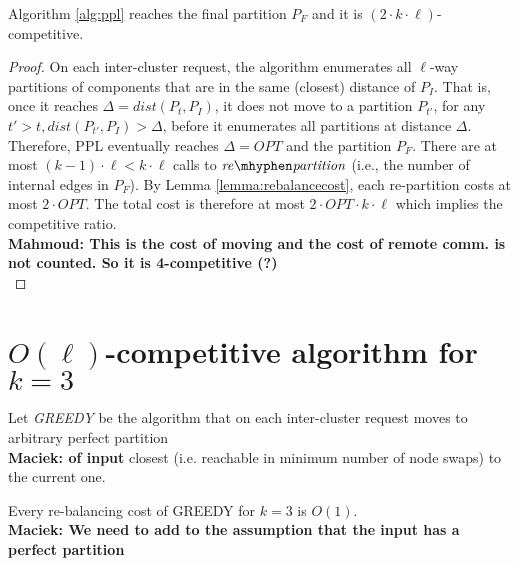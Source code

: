 \documentclass[manuscript,screen=true]{acmart}
\newcommand{\OPT}{\mathit{OPT}}
\newcommand\mahmoud[1]{\color{green}\textbf{\\ Mahmoud: #1}\\\color{black}}
\newcommand\maciek[1]{\color{brown}\textbf{\\ Maciek: #1}\color{black}}
\begin{document}
\begin{theorem}	\label{thm:upperbound}
    Algorithm \ref{alg:ppl} reaches the final partition $P_F$ and it is $(2\cdot k\cdot\ell)$-competitive.
\end{theorem}
\begin{proof}
      On each inter-cluster request,
     the algorithm enumerates all $\ell$-way partitions of components
     that are in the same (closest) distance of $P_I$.
     That is, 
     once it reaches $\Delta = \mathit{dist} (P_{t}, P_I)$,
     it does not move to a partition
     $P_{t'}$, for any $t'>t,\mathit{dist} (P_{t'}, P_I) > \Delta$,
     before it enumerates all partitions at distance $\Delta$.
     Therefore,
     PPL eventually reaches $\Delta=\OPT$ and the partition $P_F$.
    There are at most $(k-1)\cdot\ell < k\cdot\ell $ calls   to $\mathit{re\mhyphen partition}$
     (i.e., the number of internal edges in $P_F$).
    By Lemma \ref{lemma:rebalancecost},
    each re-partition costs at most $2\cdot\OPT$.
    The total cost is therefore at most $2\cdot\OPT\cdot k\cdot\ell$ which implies the competitive ratio.
    \mahmoud{This is the cost of moving and the cost of remote comm. is not counted.
    	So it is 4-competitive (?)}
 \end{proof}

\section{$O(\ell)$-competitive algorithm for $k=3$}

Let \emph{GREEDY} be the algorithm that on each inter-cluster request
 moves to arbitrary perfect partition \maciek{of input} closest (i.e. reachable in minimum number of node swaps) to the current one.


\begin{lemma} \label{lemma:k=3}
  Every re-balancing cost of GREEDY for $k=3$ is $O(1)$.
  \maciek{We need to add to the assumption that the input has a perfect partition}
  \label{rebalancing-cost}
\end{lemma}
\end{document}
